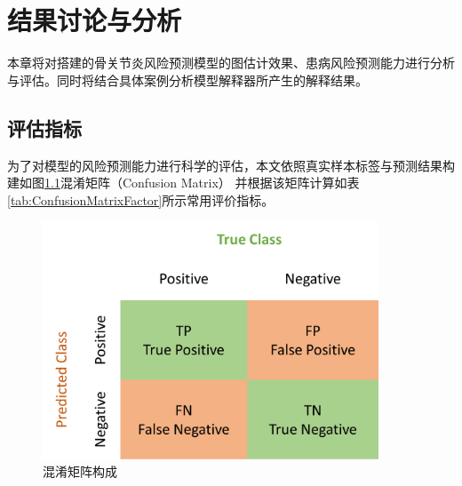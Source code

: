 \chapter{结果讨论与分析}
本章将对搭建的骨关节炎风险预测模型的图估计效果、患病风险预测能力进行分析与评估。同时将结合具体案例分析模型解释器所产生的解释结果。
\section{评估指标}
为了对模型的风险预测能力进行科学的评估，本文依照真实样本标签与预测结果构建如图\ref{fig:ConfusionMatrix}混淆矩阵（Confusion Matrix）
并根据该矩阵计算如表\ref{tab:ConfusionMatrixFactor}所示常用评价指标\cite{gaudillo_machine_2019}。

\begin{figure}[!ht]
	\centering
	\includegraphics[width=10cm]{./figures/Chapter4/GNN/ConfusionMatrix.png}
	\caption{混淆矩阵构成} \label{fig:ConfusionMatrix}
\end{figure}

